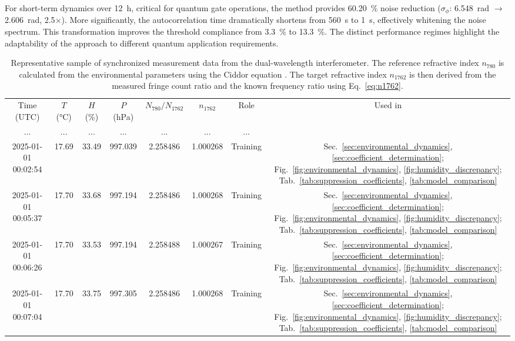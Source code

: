 \documentclass[aps,pra,reprint,groupedaddress,twocolumn,superscriptaddress]{revtex4-2}
\begin{document}
For short-term dynamics over \SI{12}{\hour}, critical for quantum gate operations, the method provides \SI{60.20}{\percent} noise reduction ($\sigma_\phi$: \SI{6.548}{\radian} $\rightarrow$ \SI{2.606}{\radian}, 2.5$\times$). More significantly, the autocorrelation time dramatically shortens from \SI{560}{\second} to \SI{1}{\second}, effectively whitening the noise spectrum. This transformation improves the threshold compliance from \SI{3.3}{\percent} to \SI{13.3}{\percent}. The distinct performance regimes highlight the adaptability of the approach to different quantum application requirements.

\begin{table}
\centering
\caption{Representative sample of synchronized measurement data from the dual-wavelength interferometer. The reference refractive index $n_{780}$ is calculated from the environmental parameters using the Ciddor equation \cite{ciddor1996refractive}. The target refractive index $n_{1762}$ is then derived from the measured fringe count ratio and the known frequency ratio using Eq.~\ref{eq:n1762}.}
\begin{ruledtabular}	
\begin{tabular}{cccccccc}
{Time (UTC)} & {$T$ (\si{\celsius})} & {$H$ (\si{\percent})} & {$P$ (\si{\hecto\pascal})} & {$N_{780}/N_{1762}$} & {$n_{1762}$} & Role & Used in\\
\colrule
... & ... & ... & ... & ... & ... & ... \\
2025-01-01 00:02:54 & 17.69 & 33.49 & 997.039 & 2.258486 & 1.000268 & Training & Sec.~\ref{sec:environmental_dynamics}, \ref{sec:coefficient_determination}; Fig.~\ref{fig:environmental_dynamics}, \ref{fig:humidity_discrepancy}; Tab.~\ref{tab:suppression_coefficients}, \ref{tab:model_comparison} \\
2025-01-01 00:05:37 & 17.70 & 33.68 & 997.194 & 2.258486 & 1.000268 & Training& Sec.~\ref{sec:environmental_dynamics}, \ref{sec:coefficient_determination}; Fig.~\ref{fig:environmental_dynamics}, \ref{fig:humidity_discrepancy}; Tab.~\ref{tab:suppression_coefficients}, \ref{tab:model_comparison} \\
2025-01-01 00:06:26 & 17.70 & 33.53 & 997.194 & 2.258488 & 1.000267 & Training& Sec.~\ref{sec:environmental_dynamics}, \ref{sec:coefficient_determination}; Fig.~\ref{fig:environmental_dynamics}, \ref{fig:humidity_discrepancy}; Tab.~\ref{tab:suppression_coefficients}, \ref{tab:model_comparison} \\
2025-01-01 00:07:04 & 17.70 & 33.75 & 997.305 & 2.258486 & 1.000268 & Training& Sec.~\ref{sec:environmental_dynamics}, \ref{sec:coefficient_determination}; Fig.~\ref{fig:environmental_dynamics}, \ref{fig:humidity_discrepancy}; Tab.~\ref{tab:suppression_coefficients}, \ref{tab:model_comparison} \\

\end{tabular}
\end{ruledtabular}
\end{table}
\end{document}
